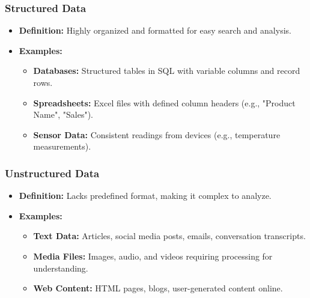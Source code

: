 \documentclass[aspectratio=169]{beamer}
\begin{document}
\begin{frame}[fragile]
    \frametitle{Structured Data}
    \begin{itemize}
        \item \textbf{Definition:} Highly organized and formatted for easy search and analysis.
        \item \textbf{Examples:}
        \begin{itemize}
            \item \textbf{Databases:} Structured tables in SQL with variable columns and record rows.
            \item \textbf{Spreadsheets:} Excel files with defined column headers (e.g., "Product Name", "Sales").
            \item \textbf{Sensor Data:} Consistent readings from devices (e.g., temperature measurements).
        \end{itemize}
    \end{itemize}
\end{frame}

\begin{frame}[fragile]
    \frametitle{Unstructured Data}
    \begin{itemize}
        \item \textbf{Definition:} Lacks predefined format, making it complex to analyze.
        \item \textbf{Examples:}
        \begin{itemize}
            \item \textbf{Text Data:} Articles, social media posts, emails, conversation transcripts.
            \item \textbf{Media Files:} Images, audio, and videos requiring processing for understanding.
            \item \textbf{Web Content:} HTML pages, blogs, user-generated content online.
        \end{itemize}
    \end{itemize}
\end{frame}
\end{document}
